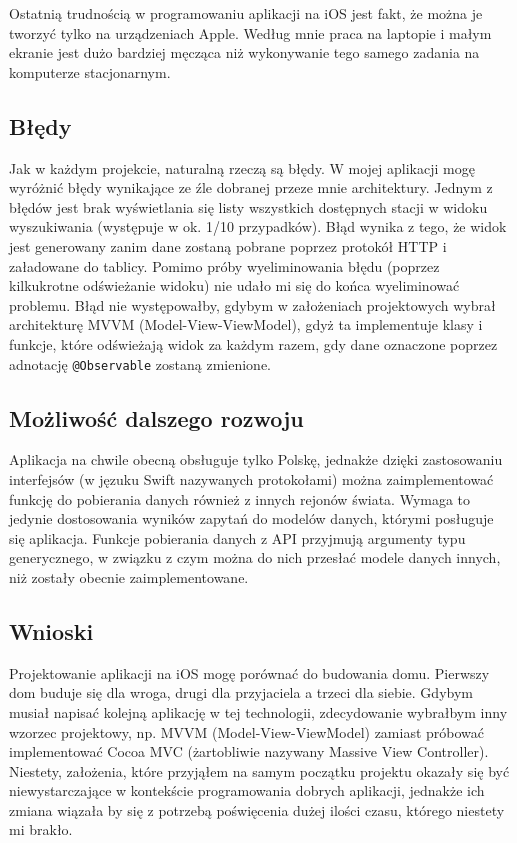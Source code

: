 \documentclass[a4paper,11pt,titlepage]{article}
\begin{document}
Ostatnią trudnością w programowaniu aplikacji na iOS jest fakt, że można je tworzyć tylko na urządzeniach Apple. Według mnie praca na laptopie i małym ekranie jest dużo bardziej męcząca niż wykonywanie tego samego zadania na komputerze stacjonarnym.

\subsection{Błędy}
Jak w każdym projekcie, naturalną rzeczą są błędy. W mojej aplikacji mogę wyróżnić błędy wynikające ze źle dobranej przeze mnie architektury. Jednym z błędów jest brak wyświetlania się listy wszystkich dostępnych stacji w widoku wyszukiwania (występuje w ok. 1/10 przypadków). Błąd wynika z tego, że widok jest generowany zanim dane zostaną pobrane poprzez protokół HTTP i załadowane do tablicy. Pomimo próby wyeliminowania błędu (poprzez kilkukrotne odświeżanie widoku) nie udało mi się do końca wyeliminować problemu. Błąd nie występowałby, gdybym w założeniach projektowych wybrał architekturę MVVM (Model-View-ViewModel), gdyż ta implementuje klasy i funkcje, które odświeżają widok za każdym razem, gdy dane oznaczone poprzez adnotację \verb|@Observable| zostaną zmienione.

\subsection{Możliwość dalszego rozwoju}
Aplikacja na chwile obecną obsługuje tylko Polskę, jednakże dzięki zastosowaniu interfejsów (w jęzuku Swift nazywanych protokołami) można zaimplementować funkcję do pobierania danych również z innych rejonów świata. Wymaga to jedynie dostosowania wyników zapytań do modelów danych, którymi posługuje się aplikacja. Funkcje pobierania danych z API przyjmują argumenty typu generycznego, w związku z czym można do nich przesłać modele danych innych, niż zostały obecnie zaimplementowane.

\subsection{Wnioski}
Projektowanie aplikacji na iOS mogę porównać do budowania domu. Pierwszy dom buduje się dla wroga, drugi dla przyjaciela a trzeci dla siebie. Gdybym musiał napisać kolejną aplikację w tej technologii, zdecydowanie wybrałbym inny wzorzec projektowy, np. MVVM (Model-View-ViewModel) zamiast próbować implementować Cocoa MVC (żartobliwie nazywany Massive View Controller).  Niestety, założenia, które przyjąłem na samym początku projektu okazały się być niewystarczające w kontekście programowania dobrych aplikacji, jednakże ich zmiana wiązała by się z potrzebą poświęcenia dużej ilości czasu, którego niestety mi brakło.
\end{document}
